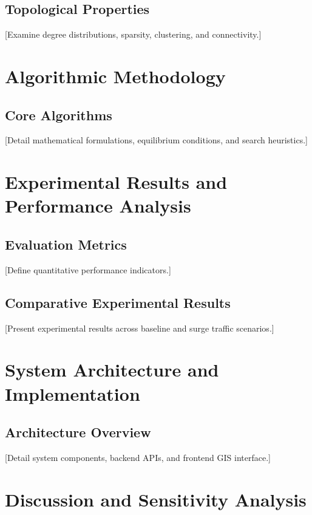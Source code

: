 \documentclass[12pt,a4paper]{report}
\begin{document}
\section{Topological Properties}
[Examine degree distributions, sparsity, clustering, and connectivity.]

\chapter{Algorithmic Methodology}
\label{chap:methodology}

\section{Core Algorithms}
[Detail mathematical formulations, equilibrium conditions, and search heuristics.]

\chapter{Experimental Results and Performance Analysis}
\label{chap:results}

\section{Evaluation Metrics}
[Define quantitative performance indicators.]

\section{Comparative Experimental Results}
[Present experimental results across baseline and surge traffic scenarios.]

\chapter{System Architecture and Implementation}
\label{chap:implementation}

\section{Architecture Overview}
[Detail system components, backend APIs, and frontend GIS interface.]

\chapter{Discussion and Sensitivity Analysis}
\label{chap:discussion}
\end{document}

